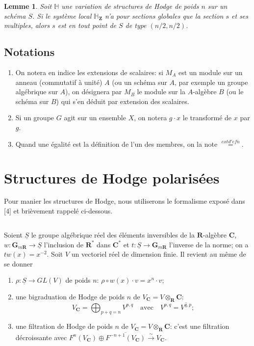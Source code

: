 \documentclass[11pt]{amsart}
\theoremstyle{plain}
\newtheorem{lemme}[theoreme]{Lemme}
\theoremstyle{definition}
\theoremstyle{remark}
\begin{document}
\begin{lemme}
Soit $\mathbb{H}$ une variation de structures de Hodge de poids $n$ sur un sch\'ema $S$. Si le syst\`eme local $\mathbb{H}_\mathbf{Z}$ n'a pour sections globales que la section $s$ et ses multiples, alors $s$ est en tout point de $S$ de type $(n/2,n/2)$.
\end{lemme}

\subsection*{Notations}
\begin{enumerate}[label=\textbf{\arabic*.}]
\item[1.5.1.] On notera en indice les extensions de scalaires: si $M_A$ est un module sur un anneau (commutatif \`a unit\'e) $A$ (ou un sch\'ema sur $A$, par exemple un groupe alg\'ebrique sur $A$), on d\'esignera par $M_B$ le module sur la $A$-alg\`ebre $B$ (ou le sch\'ema sur $B$) qui s'en d\'eduit par extension des scalaires.
\item[1.5.2.] Si un groupe $G$ agit sur un ensemble $X$, on notera $g\cdot x$ le transform\'e de $x$ par $g$.
\item[1.5.3.] Quand une \'egalit\'e est la d\'efinition de l'un des membres, on la note $\overset{	ext{d'efn}}{=}$.
\end{enumerate}

\section{Structures de Hodge polaris\'ees}

Pour manier les structures de Hodge, nous utiliserons le formalisme expos\'e dans [4] et bri\`evement rappel\'e ci-dessous.

\subsection*{}
Soient $\underline{S}$ le groupe alg\'ebrique r\'eel des \'el\'ements inversibles de la $\mathbf{R}$-alg\`ebre $\mathbf{C}$, $w\colon\mathbf{G}_{m\mathbf{R}}\to\underline{S}$ l'inclusion de $\mathbf{R}^*$ dans $\mathbf{C}^*$ et $t\colon\underline{S}\to\mathbf{G}_{m\mathbf{R}}$ l'inverse de la norme; on a $tw(x)=x^{-2}$. Soit $V$ un vectoriel r\'eel de dimension finie. Il revient au m\^eme de se donner
\begin{enumerate}[label=\alph*)]
\item $\rho\colon\underline{S}\to GL(V)$ de poids $n$: $\rho\circ w(x)\cdot v=x^n\cdot v$;
\item une bigraduation de Hodge de poids $n$ de $V_\mathbf{C}=V\otimes_\mathbf{R}\mathbf{C}$:
\begin{equation*}
V_\mathbf{C}=\bigoplus_{p+q=n}V^{p,q}\quad\text{avec}\quad V^{p,q}=\overline{V^{q,p}};
\end{equation*}
\item une filtration de Hodge de poids $n$ de $V_\mathbf{C}=V\otimes_\mathbf{R}\mathbf{C}$: c'est une filtration d\'ecroissante avec $F^n(V_\mathbf{C})\oplus\overline{F^{-n+1}(V_\mathbf{C})}\xrightarrow{\sim}V_\mathbf{C}$.
\end{enumerate}
\end{document}
